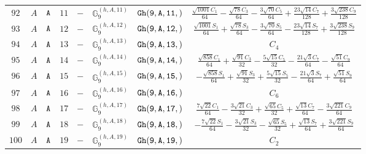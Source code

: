\documentclass[fleqn,8pt]{jsarticle}
\begin{document}
\begin{table}[ht!]
\begin{center}
\begin{tabular}{cccccccc}
$ 92 $ & $ A $ & $ {\tt A} $ & $ 11 $ & $ - $ & $ \mathbb{G}_{9}^{(h,A,11)} $ & $ {\tt Gh(9,A,11,)} $ & $ \frac{\sqrt{1001} C_{1}}{64} - \frac{\sqrt{78} C_{3}}{64} - \frac{3 \sqrt{70} C_{5}}{64} + \frac{23 \sqrt{14} C_{7}}{128} + \frac{3 \sqrt{238} C_{9}}{128} $ \\
$ 93 $ & $ A $ & $ {\tt A} $ & $ 12 $ & $ - $ & $ \mathbb{G}_{9}^{(h,A,12)} $ & $ {\tt Gh(9,A,12,)} $ & $ \frac{\sqrt{1001} S_{1}}{64} + \frac{\sqrt{78} S_{3}}{64} - \frac{3 \sqrt{70} S_{5}}{64} - \frac{23 \sqrt{14} S_{7}}{128} + \frac{3 \sqrt{238} S_{9}}{128} $ \\
$ 94 $ & $ A $ & $ {\tt A} $ & $ 13 $ & $ - $ & $ \mathbb{G}_{9}^{(h,A,13)} $ & $ {\tt Gh(9,A,13,)} $ & $ C_{4} $ \\
$ 95 $ & $ A $ & $ {\tt A} $ & $ 14 $ & $ - $ & $ \mathbb{G}_{9}^{(h,A,14)} $ & $ {\tt Gh(9,A,14,)} $ & $ \frac{\sqrt{858} C_{1}}{64} + \frac{\sqrt{91} C_{3}}{32} - \frac{5 \sqrt{15} C_{5}}{32} - \frac{21 \sqrt{3} C_{7}}{64} - \frac{\sqrt{51} C_{9}}{64} $ \\
$ 96 $ & $ A $ & $ {\tt A} $ & $ 15 $ & $ - $ & $ \mathbb{G}_{9}^{(h,A,15)} $ & $ {\tt Gh(9,A,15,)} $ & $ - \frac{\sqrt{858} S_{1}}{64} + \frac{\sqrt{91} S_{3}}{32} + \frac{5 \sqrt{15} S_{5}}{32} - \frac{21 \sqrt{3} S_{7}}{64} + \frac{\sqrt{51} S_{9}}{64} $ \\
$ 97 $ & $ A $ & $ {\tt A} $ & $ 16 $ & $ - $ & $ \mathbb{G}_{9}^{(h,A,16)} $ & $ {\tt Gh(9,A,16,)} $ & $ C_{6} $ \\
$ 98 $ & $ A $ & $ {\tt A} $ & $ 17 $ & $ - $ & $ \mathbb{G}_{9}^{(h,A,17)} $ & $ {\tt Gh(9,A,17,)} $ & $ \frac{7 \sqrt{22} C_{1}}{64} - \frac{3 \sqrt{21} C_{3}}{32} + \frac{\sqrt{65} C_{5}}{32} + \frac{\sqrt{13} C_{7}}{64} - \frac{3 \sqrt{221} C_{9}}{64} $ \\
$ 99 $ & $ A $ & $ {\tt A} $ & $ 18 $ & $ - $ & $ \mathbb{G}_{9}^{(h,A,18)} $ & $ {\tt Gh(9,A,18,)} $ & $ - \frac{7 \sqrt{22} S_{1}}{64} - \frac{3 \sqrt{21} S_{3}}{32} - \frac{\sqrt{65} S_{5}}{32} + \frac{\sqrt{13} S_{7}}{64} + \frac{3 \sqrt{221} S_{9}}{64} $ \\
$ 100 $ & $ A $ & $ {\tt A} $ & $ 19 $ & $ - $ & $ \mathbb{G}_{9}^{(h,A,19)} $ & $ {\tt Gh(9,A,19,)} $ & $ C_{2} $ \\
 \hline \hline
\end{tabular}
\end{center}
\end{table}
\end{document}
